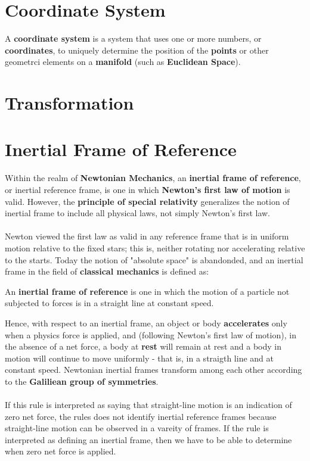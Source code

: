 \section{Coordinate System}
A \textbf{coordinate system} is a system that uses one or more numbers, or \textbf{coordinates}, to uniquely determine the position of the \textbf{points} or other geometrci elements on a \textbf{manifold} (such as \textbf{Euclidean Space}).

\section{Transformation}

\section{Inertial Frame of Reference}
Within the realm of \textbf{Newtonian Mechanics}, an \textbf{inertial frame of reference}, or inertial reference frame, is one in which \textbf{Newton's first law of motion} is valid. However, the \textbf{principle of special relativity} generalizes the notion of inertial frame to include all physical laws, not simply Newton's first law.
\\\\
Newton viewed the first law as valid in any reference frame that is in uniform motion relative to the fixed stars; this is, neither rotating nor accelerating relative to the starts. Today the notion of "absolute space" is abandonded, and an inertial frame in the field of \textbf{classical mechanics} is defined as:
\begin{definition}
An \textbf{inertial frame of reference} is one in which the motion of a particle not subjected to forces is in a straight line at constant speed.
\end{definition}
Hence, with respect to an inertial frame, an object or body \textbf{accelerates} only when a physics force is applied, and (following Newton's first law of motion), in the absence of a net force, a body at \textbf{rest} will remain at rest and a body in motion will continue to move uniformly - that is, in a straigth line and at constant speed. Newtonian inertial frames transform among each other according to the \textbf{Galiliean group of symmetries}.
\\\\
If this rule is interpreted as saying that straight-line motion is an indication of zero net force, the rules does not identify inertial reference frames because straight-line motion can be observed in a vareity of frames. If the rule is interpreted as defining an inertial frame, then we have to be able to determine when zero net force is applied.

